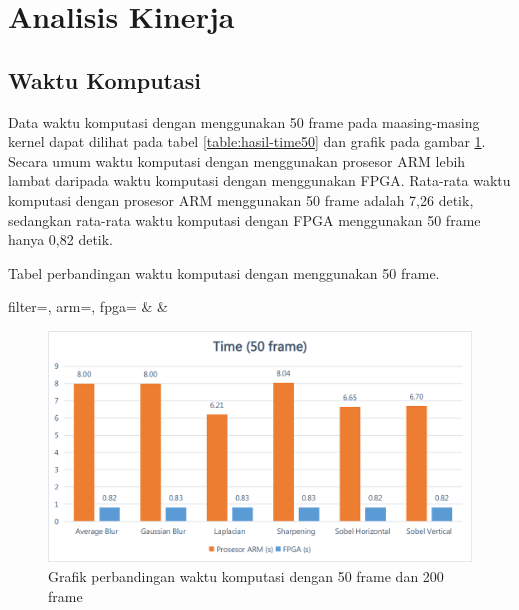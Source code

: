 \section{Analisis Kinerja}
\subsection{Waktu Komputasi}

Data waktu komputasi dengan menggunakan 50 frame pada maasing-masing kernel dapat dilihat pada tabel \ref{table:hasil-time50} dan grafik pada gambar \ref{fig:chart-time50}. Secara umum waktu komputasi dengan menggunakan prosesor ARM lebih lambat daripada waktu komputasi dengan menggunakan FPGA. Rata-rata waktu komputasi dengan prosesor ARM menggunakan 50 frame adalah 7,26 detik, sedangkan rata-rata waktu komputasi dengan FPGA menggunakan 50 frame hanya 0,82 detik.
\begin{atable}
    \caption{Tabel perbandingan waktu komputasi dengan menggunakan 50 frame.}
    \label{table:hasil-time50}
        {
            filter=\filter, 
            arm=\arm, 
            fpga=\fpga}
        {
            \filter & 
            \arm & 
            \fpga }
\end{atable}
\begin{figure}[H]
    \centering
    \includegraphics[width=0.81\linewidth, center]{images/chart/chart-time50.png}
    \caption{Grafik perbandingan waktu komputasi dengan 50 frame dan 200 frame}
    \label{fig:chart-time50}
\end{figure}

